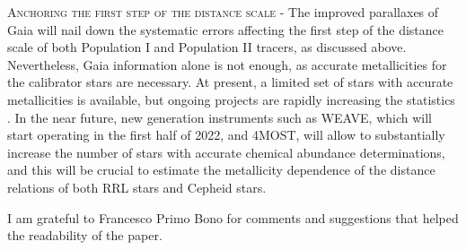 \documentclass{mem}
\begin{document}
\textsc{Anchoring the first step of the distance scale - } The improved parallaxes of Gaia will nail down the systematic errors affecting the first step of the distance scale of both Population I and Population II tracers, as discussed above. Nevertheless, Gaia information alone is not enough, as accurate metallicities for the calibrator stars are necessary. At present, a limited set of stars with accurate metallicities is available, but ongoing projects are rapidly increasing the statistics \citep{crestani21b}. In the near future, new generation instruments such as WEAVE, which will start operating in the first half of 2022, and 4MOST, will allow to substantially increase the number of stars with accurate chemical abundance determinations, and this will be crucial to estimate the metallicity dependence of the distance relations of both RRL stars and Cepheid stars.





 
\begin{acknowledgements}
I am grateful to Francesco Primo Bono for comments and suggestions that helped the readability of the paper.
\end{acknowledgements}
\end{document}
